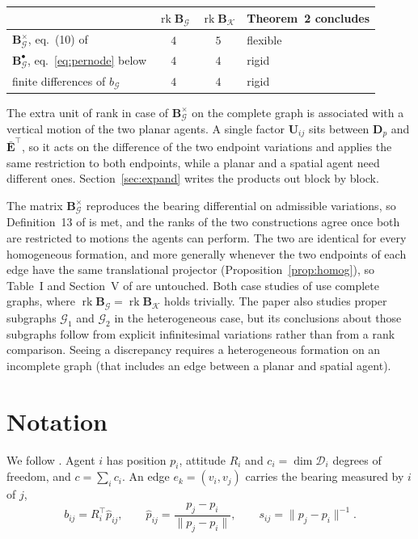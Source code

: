 \documentclass[11pt,a4paper]{article}
\theoremstyle{plain}
\theoremstyle{definition}
\newcommand{\rank}{\operatorname{rk}}
\newcommand{\Bper}{\mathbf{B}^{\times}}
\newcommand{\Bnode}{\mathbf{B}^{\bullet}}
\newcommand{\Ebar}{\bar{\mathbf{E}}}
\newcommand{\Dp}{\mathbf{D}_p}
\begin{document}
\begin{center}
\begin{tabular}{lccl}
\toprule
& $\rank\mathbf B_{\mathcal G}$ & $\rank\mathbf B_{\mathcal K}$ & Theorem~2 concludes\\
\midrule
$\Bper_{\mathcal G}$, eq.~(10) of \cite{michieletto2021} & $4$ & $5$ & flexible\\
$\Bnode_{\mathcal G}$, eq.~\eqref{eq:pernode} below        & $4$ & $4$ & rigid\\
finite differences of $b_{\mathcal G}$            & $4$ & $4$ & rigid\\
\bottomrule
\end{tabular}
\end{center}

The extra unit of rank in case of $\Bper_{\mathcal G}$ on the complete graph is associated with a vertical motion of
the two planar agents. A single factor $\mathbf U_{ij}$ sits between $\Dp$ and
$\Ebar^\top$, so it acts on the difference of the two endpoint variations and
applies the same restriction to both endpoints, while a planar and a spatial
agent need different ones. Section~\ref{sec:expand} writes the products out
block by block.

The matrix $\Bper_{\mathcal G}$ reproduces the bearing differential on
admissible variations, so Definition~13 of \cite{michieletto2021} is met, and
the ranks of the two constructions agree once both are restricted to motions
the agents can perform.
The two are identical for every homogeneous formation, and more generally
whenever the two endpoints of each edge have the same translational projector
(Proposition~\ref{prop:homog}), so Table~I and Section~V of
\cite{michieletto2021} are untouched. Both case studies of
\cite{michieletto2021} use complete graphs, where
$\rank\mathbf B_{\mathcal G}=\rank\mathbf B_{\mathcal K}$ holds trivially. The
paper also studies proper subgraphs $\mathcal G_1$ and $\mathcal G_2$ in the
heterogeneous case, but its conclusions about those subgraphs follow from
explicit infinitesimal variations rather than from a rank comparison. Seeing a
discrepancy requires a heterogeneous formation on an incomplete graph (that includes an edge between a planar and spatial agent).

\section{Notation}

We follow \cite{michieletto2021}. Agent $i$ has position $p_i$, attitude $R_i$
and $c_i=\dim\mathcal D_i$ degrees of freedom, and $c=\sum_ic_i$. An edge
$e_k=(v_i,v_j)$ carries the bearing measured by $i$ of $j$,
\begin{equation}\label{eq:bearing}
  b_{ij}=R_i^\top\hat p_{ij},
  \qquad
  \hat p_{ij}=\frac{p_j-p_i}{\lVert p_j-p_i\rVert},
  \qquad
  s_{ij}=\lVert p_j-p_i\rVert^{-1}.
\end{equation}
\end{document}
